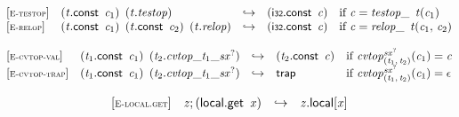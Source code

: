\vspace{1ex}

$$
\begin{array}{@{}l@{}lcl@{}l@{}}
{[\textsc{\scriptsize E{-}testop}]} \quad & ({\mathit{t}}.\mathsf{const}~\,{\mathit{c}}_{{1}})~\,({\mathit{t}} . {\mathit{testop}}) &\hookrightarrow& (\mathsf{i{\scriptstyle32}}.\mathsf{const}~\,{\mathit{c}}) &\quad
  \mbox{if}~{\mathit{c}} = {{{\mathit{testop}}}{\mathsf{\_}}~\,{\mathit{t}}}{({\mathit{c}}_{{1}})} \\
{[\textsc{\scriptsize E{-}relop}]} \quad & ({\mathit{t}}.\mathsf{const}~\,{\mathit{c}}_{{1}})~\,({\mathit{t}}.\mathsf{const}~\,{\mathit{c}}_{{2}})~\,({\mathit{t}} . {\mathit{relop}}) &\hookrightarrow& (\mathsf{i{\scriptstyle32}}.\mathsf{const}~\,{\mathit{c}}) &\quad
  \mbox{if}~{\mathit{c}} = {{{\mathit{relop}}}{\mathsf{\_}}~\,{\mathit{t}}}{({\mathit{c}}_{{1}},\, {\mathit{c}}_{{2}})} \\
\end{array}
$$

\vspace{1ex}

$$
\begin{array}{@{}l@{}lcl@{}l@{}}
{[\textsc{\scriptsize E{-}cvtop{-}val}]} \quad & ({\mathit{t}}_{{1}}.\mathsf{const}~\,{\mathit{c}}_{{1}})~\,({\mathit{t}}_{{2}} . {{{{{\mathit{cvtop}}}{\mathsf{\_}}}{{\mathit{t}}_{{1}}}}{\mathsf{\_}}}{{{\mathit{sx}}^?}}) &\hookrightarrow& ({\mathit{t}}_{{2}}.\mathsf{const}~\,{\mathit{c}}) &\quad
  \mbox{if}~{{{\mathit{cvtop}}}{{{}_{({\mathit{t}}_{{1}},\, {\mathit{t}}_{{2}})}^{{{\mathit{sx}}^?}}}}}{({\mathit{c}}_{{1}})} = {\mathit{c}} \\
{[\textsc{\scriptsize E{-}cvtop{-}trap}]} \quad & ({\mathit{t}}_{{1}}.\mathsf{const}~\,{\mathit{c}}_{{1}})~\,({\mathit{t}}_{{2}} . {{{{{\mathit{cvtop}}}{\mathsf{\_}}}{{\mathit{t}}_{{1}}}}{\mathsf{\_}}}{{{\mathit{sx}}^?}}) &\hookrightarrow& \mathsf{trap} &\quad
  \mbox{if}~{{{\mathit{cvtop}}}{{{}_{({\mathit{t}}_{{1}},\, {\mathit{t}}_{{2}})}^{{{\mathit{sx}}^?}}}}}{({\mathit{c}}_{{1}})} = \epsilon \\
\end{array}
$$

\vspace{1ex}

$$
\begin{array}{@{}l@{}lcl@{}l@{}}
{[\textsc{\scriptsize E{-}local.get}]} \quad & {\mathit{z}} ; (\mathsf{local.get}~\,{\mathit{x}}) &\hookrightarrow& {{\mathit{z}}.\mathsf{local}}{{}[{\mathit{x}}]} &  \\
\end{array}
$$

